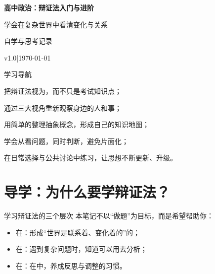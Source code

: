 \documentclass[a4paper,11pt]{ctexart}
\renewcommand{\notetitle}{高中政治：辩证法入门与进阶}
\renewcommand{\notesubtitle}{学会在复杂世界中看清变化与关系}
\renewcommand{\noteauthor}{自学与思考记录}
\renewcommand{\notedate}{\today}
\renewcommand{\noteversion}{v1.0}
\begin{document}
\thispagestyle{empty}
\setcounter{page}{1}

\MathNoteEnablePrint

\noindent
\begin{minipage}[t][0.7\textheight][c]{\textwidth}
  \raggedleft
  \vspace*{\fill}
  {\sffamily\bfseries\Huge\color{accent}\notetitle\par}
  \vspace{0.6em}
  {\Large\color{inkgray}\notesubtitle\par}
  \vspace{0.5em}
  {\large\color{inkgray}\noteauthor\par}
  \vspace{0.4em}
  {\normalsize\color{inkgray}\noteversion\quad|\quad\notedate\par}
  \vspace*{\fill}
\end{minipage}

\begin{center}
\begin{minipage}{0.84\textwidth}
  \textcolor{inkgray}{\sffamily\small 学习导航}\\[0.4em]
  \begin{focuspoints}
    \item 把辩证法视为，而不只是考试知识点；
    \item 通过三大视角重新观察身边的人和事；
    \item 用简单的整理抽象概念，形成自己的知识地图；
    \item 学会从看问题，同时判断，避免片面化；
    \item 在日常选择与公共讨论中练习，让思想不断更新、升级。
  \end{focuspoints}
\end{minipage}
\end{center}

\clearpage
\thispagestyle{plain}
\tableofcontents
\newpage

\section{导学：为什么要学辩证法？}

\begin{summarybox}{学习辩证法的三个层次}
本笔记不以“做题”为目标，而是希望帮助你：
\begin{itemize}
  \item 在：形成“世界是联系着、变化着的”的；
  \item 在：遇到复杂问题时，知道可以用去分析；
  \item 在：在中，养成反思与调整的习惯。
\end{itemize}
\end{summarybox}
\end{document}
